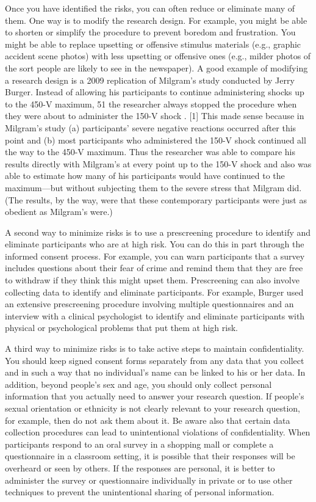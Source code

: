 Once you have identified the risks, you can often reduce or eliminate many of them. One way is to modify the research design. For example, you might be able to shorten or simplify the procedure to prevent boredom and frustration. You might be able to replace upsetting or offensive stimulus materials (e.g., graphic accident scene photos) with less upsetting or offensive ones (e.g., milder photos of the sort people are likely to see in the newspaper). A good example of modifying a research design is a 2009 replication of Milgram's study conducted by Jerry Burger. Instead of allowing his participants to continue administering shocks up to the 450-V maximum, 51 the researcher always stopped the procedure when they were about to administer the 150-V shock \citep{burger_replicating_2009}. [1] This made sense because in Milgram's study (a) participants' severe negative reactions occurred after this point and (b) most participants who administered the 150-V shock continued all the way to the 450-V maximum. Thus the researcher was able to compare his results directly with Milgram's at every point up to the 150-V shock and also was able to estimate how many of his participants would have continued to the maximum---but without subjecting them to the severe stress that Milgram did. (The results, by the way, were that these contemporary participants were just as obedient as Milgram's were.)

A second way to minimize risks is to use a prescreening procedure to identify and eliminate participants who are at high risk. You can do this in part through the informed consent process. For example, you can warn participants that a survey includes questions about their fear of crime and remind them that they are free to withdraw if they think this might upset them. Prescreening can also involve collecting data to identify and eliminate participants. For example, Burger used an extensive prescreening procedure involving multiple questionnaires and an interview with a clinical psychologist to identify and eliminate participants with physical or psychological problems that put them at high risk.

A third way to minimize risks is to take active steps to maintain confidentiality. You should keep signed consent forms separately from any data that you collect and in such a way that no individual's name can be linked to his or her data. In addition, beyond people's sex and age, you should only collect personal information that you actually need to answer your research question. If people's sexual orientation or ethnicity is not clearly relevant to your research question, for example, then do not ask them about it. Be aware also that certain data collection procedures can lead to unintentional violations of confidentiality. When participants respond to an oral survey in a shopping mall or complete a questionnaire in a classroom setting, it is possible that their responses will be overheard or seen by others. If the responses are personal, it is better to administer the survey or questionnaire individually in private or to use other techniques to prevent the unintentional sharing of personal information.

